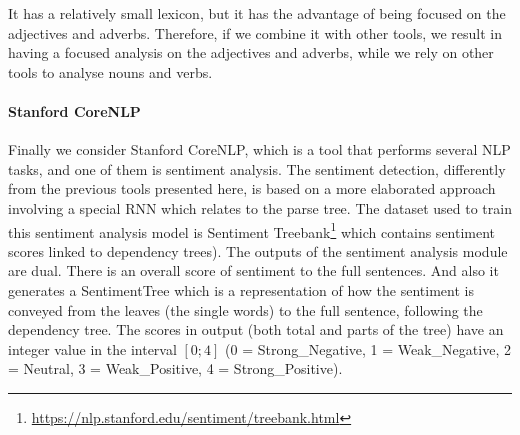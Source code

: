It has a relatively small lexicon, but it has the advantage of being focused on the adjectives and adverbs.
Therefore, if we combine it with other tools, we result in having a focused analysis on the adjectives and adverbs, while we rely on other tools to analyse nouns and verbs.


\paragraph{Stanford CoreNLP}
Finally we consider Stanford CoreNLP, which is a tool that performs several NLP tasks, and one of them is sentiment analysis.
The sentiment detection, differently from the previous tools presented here, is based on a more elaborated approach involving a special RNN which relates to the parse tree. 
The dataset used to train this sentiment analysis model is Sentiment Treebank\footnote{\url{https://nlp.stanford.edu/sentiment/treebank.html}} which contains sentiment scores linked to dependency trees).
The outputs of the sentiment analysis module are dual. There is an overall score of sentiment to the full sentences. And also it generates a SentimentTree which is a representation of how the sentiment is conveyed from the leaves (the single words) to the full sentence, following the dependency tree.
The scores in output (both total and parts of the tree) have an integer value in the interval $[0;4]$ (0 = Strong\_Negative, 1 = Weak\_Negative, 2 = Neutral, 3 = Weak\_Positive, 4 = Strong\_Positive).


